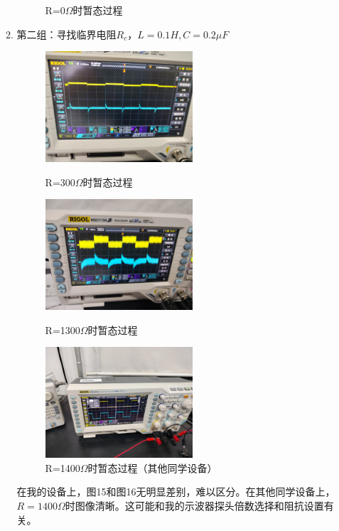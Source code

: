 \documentclass[UTF8]{article}
\begin{document}
\begin{enumerate}
\begin{enumerate}
\begin{figure}[H]
            \caption{R=0$\Omega$时暂态过程}   
        \end{figure}
        \item 第二组：寻找临界电阻$R_c$，$L=0.1H,C=0.2\mu F$
        \begin{figure}[H]
            \begin{minipage}[t]{0.33\linewidth}
                \centering
                \includegraphics[width=5.5cm]{Fig/11.jpg}
                \caption{R=300$\Omega$时暂态过程}
            \end{minipage}
            \begin{minipage}[t]{0.33\linewidth}
                \centering
                \includegraphics[width=5.5cm]{Fig/12.jpg}
                \caption{R=1300$\Omega$时暂态过程}
            \end{minipage}
            \begin{minipage}[t]{0.33\linewidth}
                \centering
                \includegraphics[width=5.5cm]{Fig/13.jpg}
                \caption{R=1400$\Omega$时暂态过程（其他同学设备）}
            \end{minipage}
        \end{figure}
        \hspace*{2em}在我的设备上，图15和图16无明显差别，难以区分。在其他同学设备上，$R=1400\Omega$时图像清晰。这可能和我的示波器探头倍数选择和阻抗设置有关。

\end{enumerate}
\end{enumerate}
\end{document}
